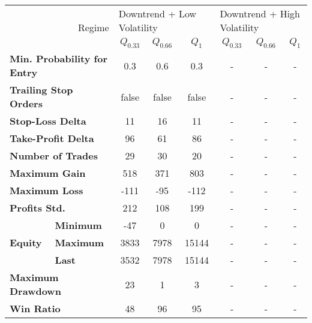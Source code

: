 \centering
\begin{tabular}{ll|cccccc}
    \toprule
    \multicolumn{2}{r|}{\multirow{2}{*}{Regime}} & \multicolumn{3}{l}{Downtrend + Low Volatility}   & \multicolumn{3}{l}{Downtrend + High Volatility}   \\
    \multicolumn{2}{r|}{} & $Q_{0.33}$ & $Q_{0.66}$ & $Q_{1}$ & $Q_{0.33}$ & $Q_{0.66}$ & $Q_{1}$ \\
    \midrule
    \multicolumn{2}{l|}{\textbf{Min. Probability for Entry}} & 0.3 & 0.6 & 0.3 & - & - & - \\
    \multicolumn{2}{l|}{\textbf{Trailing Stop Orders}} & false & false & false & - & - & - \\
    \multicolumn{2}{l|}{\textbf{Stop-Loss Delta}} & 11 & 16 & 11 & - & - & - \\
    \multicolumn{2}{l|}{\textbf{Take-Profit Delta}} & 96 & 61 & 86 & - & - & - \\
    \midrule
    \multicolumn{2}{l|}{\textbf{Number of Trades}} & 29 & 30 & 20 & - & - & - \\
    \multicolumn{2}{l|}{\textbf{Maximum Gain}} & 518 & 371 & 803 & - & - & - \\
    \multicolumn{2}{l|}{\textbf{Maximum Loss}} & -111 & -95 & -112 & - & - & - \\
    \multicolumn{2}{l|}{\textbf{Profits Std.}} & 212 & 108 & 199 & - & - & - \\
    \multirow{3}{*}{\textbf{Equity}} & \textbf{Minimum} & -47  & 0    & 0     & - & - & - \\
    & \textbf{Maximum} & 3833 & 7978 & 15144 & - & - & - \\
    & \textbf{Last}    & 3532 & 7978 & 15144 & - & - & - \\
    \multicolumn{2}{l|}{\textbf{Maximum Drawdown}} & 23 & 1 & 3 & - & - & - \\
    \multicolumn{2}{l|}{\textbf{Win Ratio}} & 48 & 96 & 95 & - & - & - \\
    \bottomrule
\end{tabular}